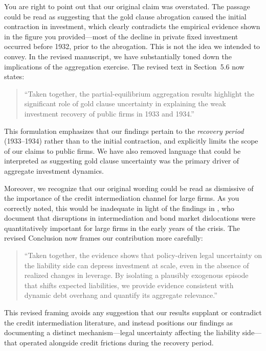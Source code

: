 \noindent You are right to point out that our original claim was overstated. The passage could be read as suggesting that the gold clause abrogation caused the initial contraction in investment, which clearly contradicts the empirical evidence shown in the figure you provided---most of the decline in private fixed investment occurred before 1932, prior to the abrogation. This is not the idea we intended to convey. In the revised manuscript, we have substantially toned down the implications of the aggregation exercise. The revised text in Section~5.6 now states:
\begin{quotation}
``Taken together, the partial-equilibrium aggregation results highlight the significant role of gold clause uncertainty in explaining the weak investment recovery of public firms in 1933 and 1934.''
\end{quotation}
This formulation emphasizes that our findings pertain to the \textit{recovery period} (1933--1934) rather than to the initial contraction, and explicitly limits the scope of our claims to public firms. We have also removed language that could be interpreted as suggesting gold clause uncertainty was the primary driver of aggregate investment dynamics.

Moreover, we recognize that our original wording could be read as dismissive of the importance of the credit intermediation channel for large firms. As you correctly noted, this would be inadequate in light of the findings in \cite{Benmelech2018}, who document that disruptions in intermediation and bond market dislocations were quantitatively important for large firms in the early years of the crisis. The revised Conclusion now frames our contribution more carefully:
\begin{quotation}
  ``Taken together, the evidence shows that policy-driven legal uncertainty on the liability side can depress investment at scale, even in the absence of realized changes in leverage. By isolating a plausibly exogenous episode that shifts expected liabilities, we provide evidence consistent with dynamic debt overhang and quantify its aggregate relevance.''
\end{quotation}
This revised framing avoids any suggestion that our results supplant or contradict the credit intermediation literature, and instead positions our findings as documenting a distinct mechanism---legal uncertainty affecting the liability side---that operated alongside credit frictions during the recovery period.


\bigskip

